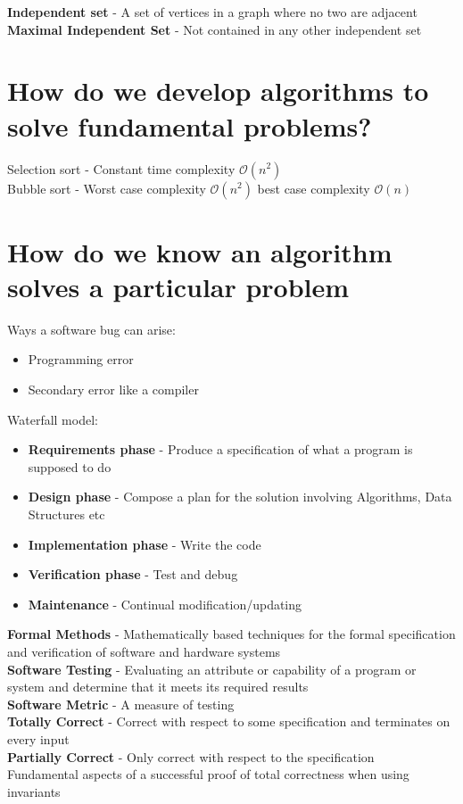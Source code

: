 \documentclass{article}[18pt]
\begin{document}
\textbf{Independent set} - A set of vertices in a graph where no two are adjacent\\
\textbf{Maximal Independent Set} - Not contained in any other independent set
\section{How do we develop algorithms to solve fundamental problems?}
Selection sort - Constant time complexity $\mathcal{O}(n^2)$\\
Bubble sort - Worst case complexity $\mathcal{O}(n^2)$ best case complexity $\mathcal{O}(n)$
\section{How do we know an algorithm solves a particular problem}
Ways a software bug can arise:
\begin{itemize}
	\item Programming error
	\item Secondary error like a compiler
\end{itemize}
Waterfall model:
\begin{itemize}
	\item \textbf{Requirements phase} - Produce a specification of what a program is supposed to do
	\item \textbf{Design phase} - Compose a plan for the solution involving Algorithms, Data Structures etc
	\item \textbf{Implementation phase} - Write the code
	\item \textbf{Verification phase} - Test and debug
	\item \textbf{Maintenance} - Continual modification/updating
\end{itemize}
\textbf{Formal Methods} - Mathematically based techniques for the formal specification and verification of software and hardware systems\\
\textbf{Software Testing} - Evaluating an attribute or capability of a program or system and determine that it meets its required results\\
\textbf{Software Metric} - A measure of testing\\
\textbf{Totally Correct} - Correct with respect to some specification and terminates on every input\\
\textbf{Partially Correct} - Only correct with respect to the specification\\
Fundamental aspects of a successful proof of total correctness when using invariants
\end{document}
